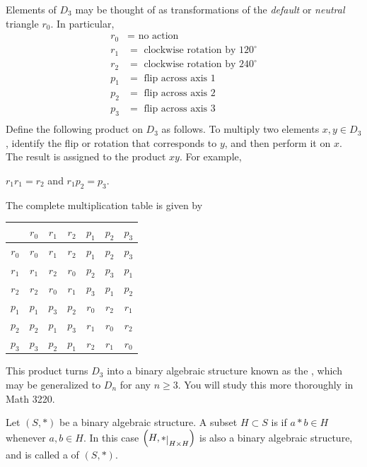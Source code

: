 \documentclass[11pt,fleqn,dvipsnames,usenames]{article}
\newcommand{\p}{\noindent}
\begin{document}
\begin{examples}
\begin{enumerate}[(a)]
\p Elements of $D_3$ may be thought of as transformations of the \emph{default} or \emph{neutral} triangle $r_{0}$.  In particular,
\begin{align*}
r_0 &= \text{ no action }\\
r_1 &= \text{ clockwise rotation by }120^{\circ}\\
r_2 &= \text{ clockwise rotation by }240^{\circ}\\
p_1 &= \text{ flip across axis }1\\
p_2 &= \text{ flip across axis }2\\
p_3 &= \text{ flip across axis }3\\
\end{align*}
\p Define the following product on $D_{3}$ as follows.  To multiply two elements $x,y\in D_3$, identify the flip or rotation that corresponds to $y$, and then perform it on $x$.  The result is assigned to the product $xy$.  For example,
\begin{center}
$r_{1}r_{1} = r_{2}$ and $r_{1}p_{2} = p_{3}$.
\end{center}
\p The complete multiplication table is given by
\bgroup
\begin{center}
\def\arraystretch{1.5}
\begin{tabular}{c|cccccc}
 & $r_{0}$ & $r_{1}$ & $r_{2}$ & $p_{1}$ & $p_{2}$ & $p_{3}$\\
\hline
$r_{0}$ & $r_{0}$ & $r_{1}$ & $r_{2}$ & $p_{1}$ & $p_{2}$ & $p_{3}$\\
$r_{1}$ & $r_{1}$ & $r_{2}$ & $r_{0}$ & $p_{2}$ & $p_{3}$ & $p_{1}$\\
$r_{2}$ & $r_{2}$ & $r_{0}$ & $r_{1}$ & $p_{3}$ & $p_{1}$ & $p_{2}$\\
$p_{1}$ & $p_{1}$ & $p_{3}$ & $p_{2}$ & $r_{0}$ & $r_{2}$ & $r_{1}$\\
$p_{2}$ & $p_{2}$ & $p_{1}$ & $p_{3}$ & $r_{1}$ & $r_{0}$ &$r_{2}$\\
$p_{3}$ & $p_{3}$ & $p_{2}$ & $p_{1}$ & $r_{2}$ & $r_{1}$ & $r_{0}$
\end{tabular}
\end{center}
\egroup
\p This product turns $D_{3}$ into a binary algebraic structure known as the , which may be generalized to $D_n$ for any $n\geq 3$.  You will study this more thoroughly in Math 3220.  
\end{enumerate}
\end{examples}
%
\begin{definition}
Let $(S,*)$ be a binary algebraic structure.  A subset $H\subset S$ is  if $a*b\in H$ whenever $a,b\in H$.  In this case $\left(H,*\restrict{H\times H}\right)$ is also a binary algebraic structure, and is called a  of $(S,*)$.
\end{definition}
\end{document}
